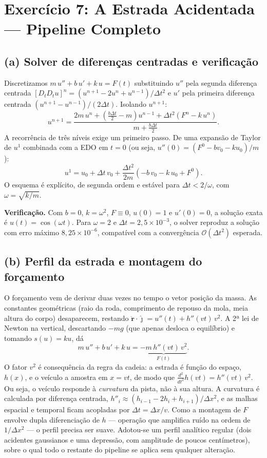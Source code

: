 \documentclass{article}
\begin{document}
\section*{Exercício 7: A Estrada Acidentada — Pipeline Completo}

\subsection*{(a) Solver de diferenças centradas e verificação}

Discretizamos $m\,u'' + b\,u' + k\,u = F(t)$ substituindo $u''$ pela segunda diferença centrada $[D_tD_t u]^n = (u^{n+1}-2u^n+u^{n-1})/\Delta t^2$ e $u'$ pela primeira diferença centrada $(u^{n+1}-u^{n-1})/(2\Delta t)$. Isolando $u^{n+1}$:
\[
u^{n+1} = \frac{2m\,u^n + \left(\tfrac{b\Delta t}{2}-m\right)u^{n-1} + \Delta t^2\left(F^n - k\,u^n\right)}{m + \tfrac{b\Delta t}{2}}.
\]
A recorrência de três níveis exige um primeiro passo. De uma expansão de Taylor de $u^1$ combinada com a EDO em $t=0$ (ou seja, $u''(0)=(F^0-b v_0-k u_0)/m$):
\[
u^1 = u_0 + \Delta t\,v_0 + \frac{\Delta t^2}{2m}\left(-b\,v_0 - k\,u_0 + F^0\right).
\]
O esquema é explícito, de segunda ordem e estável para $\Delta t < 2/\omega$, com $\omega=\sqrt{k/m}$.

\textbf{Verificação.} Com $b=0$, $k=\omega^2$, $F\equiv 0$, $u(0)=1$ e $u'(0)=0$, a solução exata é $u(t)=\cos(\omega t)$. Para $\omega=2$ e $\Delta t=2{,}5\times10^{-3}$, o solver reproduz a solução com erro máximo $8{,}25\times10^{-6}$, compatível com a convergência $\mathcal{O}(\Delta t^2)$ esperada.

\subsection*{(b) Perfil da estrada e montagem do forçamento}

O forçamento vem de derivar duas vezes no tempo o vetor posição da massa. As constantes geométricas (raio da roda, comprimento de repouso da mola, meia altura do corpo) desaparecem, restando $\ddot{\mathbf r}\cdot\hat{\jmath} = u''(t) + h''(vt)\,v^2$. A 2ª lei de Newton na vertical, descartando $-mg$ (que apenas desloca o equilíbrio) e tomando $s(u)=ku$, dá
\[
m\,u'' + b\,u' + k\,u = \underbrace{-m\,h''(vt)\,v^2}_{F(t)}.
\]
O fator $v^2$ é consequência da regra da cadeia: a estrada é função do espaço, $h(x)$, e o veículo a amostra em $x=vt$, de modo que $\tfrac{d^2}{dt^2}h(vt)=h''(vt)\,v^2$. Ou seja, o veículo responde à \textit{curvatura} da pista, não à sua altura. A curvatura é calculada por diferença centrada, $h''_i \approx (h_{i-1}-2h_i+h_{i+1})/\Delta x^2$, e as malhas espacial e temporal ficam acopladas por $\Delta t = \Delta x/v$. Como a montagem de $F$ envolve dupla diferenciação de $h$ — operação que amplifica ruído na ordem de $1/\Delta x^2$ — o perfil precisa ser suave. Adotou-se um perfil analítico regular (dois acidentes gaussianos e uma depressão, com amplitude de poucos centímetros), sobre o qual todo o restante do pipeline se aplica sem qualquer alteração.
\end{document}

